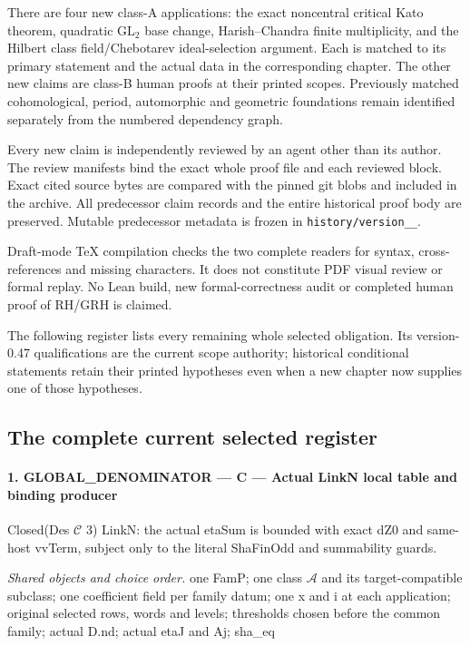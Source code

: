 There are four new class-A applications: the exact noncentral critical
Kato theorem, quadratic \(\mathrm{GL}_2\) base change,
Harish--Chandra finite multiplicity, and the Hilbert class
field/Chebotarev ideal-selection argument. Each is matched to its
primary statement and the actual data in the corresponding chapter.
The other new claims are class-B human proofs at their printed scopes.
Previously matched cohomological, period, automorphic and geometric
foundations remain identified separately from the numbered dependency
graph.

Every new claim is independently reviewed by an agent other than its
author. The review manifests bind the exact whole proof file and each
reviewed block. Exact cited source bytes are compared with the pinned
git blobs and included in the archive. All predecessor claim records
and the entire historical proof body are preserved. Mutable predecessor
metadata is frozen in \texttt{history/\allowbreak version\_\_}.

Draft-mode TeX compilation checks the two complete readers for syntax,
cross-references and missing characters. It does not constitute PDF
visual review or formal replay. No Lean build, new formal-correctness
audit or completed human proof of RH/GRH is claimed.

The following register lists every remaining whole selected obligation.
Its version-0.47 qualifications are the current scope authority;
historical conditional statements retain their printed hypotheses even
when a new chapter now supplies one of those hypotheses.

\subsection{The complete current selected register}

\paragraph{1. GLOBAL\_\allowbreak DENOMINATOR — C — Actual LinkN local table and binding producer}

Closed(Des $\mathcal C$ 3) LinkN: the actual etaSum is bounded with exact dZ0 and same-host vvTerm, subject only to the literal ShaFinOdd and summability guards.

\emph{Shared objects and choice order.} one FamP; one class $\mathcal A$ and its target-compatible subclass; one coefficient field per family datum; one x and i at each application; original selected rows, words and levels; thresholds chosen before the common family; actual D.nd; actual etaJ and Aj; sha\_\allowbreak eq

